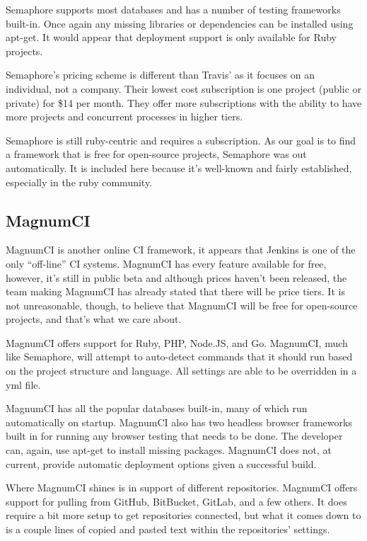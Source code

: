 \documentclass[12pt]{ucthesis}
\begin{document}
Semaphore supports most databases and has a number of testing frameworks built-in. Once again any missing libraries or dependencies can be installed using apt-get. It would appear that deployment support is only available for Ruby projects.

Semaphore's pricing scheme is different than Travis' as it focuses on an individual, not a company. Their lowest cost subscription is one project (public or private) for \$14 per month. They offer more subscriptions with the ability to have more projects and concurrent processes in higher tiers.

Semaphore is still ruby-centric and requires a subscription. As our goal is to find a framework that is free for open-source projects, Semaphore was out automatically. It is included here because it's well-known and fairly established, especially in the ruby community.

\subsection{MagnumCI}
MagnumCI\cite{MagnumCI} is another online CI framework, it appears that Jenkins is one of the only ``off-line'' CI systems. MagnumCI has every feature available for free, however, it's still in public beta and although prices haven't been released, the team making MagnumCI has already stated that there will be price tiers. It is not unreasonable, though, to believe that MagnumCI will be free for open-source projects, and that's what we care about.

MagnumCI offers support for Ruby, PHP, Node.JS, and Go. MagnumCI, much like Semaphore, will attempt to auto-detect commands that it should run based on the project structure and language. All settings are able to be overridden in a yml file.

MagnumCI has all the popular databases built-in, many of which run automatically on startup. MagnumCI also has two headless browser frameworks built in for running any browser testing that needs to be done. The developer can, again, use apt-get to install missing packages. MagnumCI does not, at current, provide automatic deployment options given a successful build.

Where MagnumCI shines is in support of different repositories. MagnumCI offers support for pulling from GitHub, BitBucket, GitLab, and a few others. It does require a bit more setup to get repositories connected, but what it comes down to is a couple lines of copied and pasted text within the repositories' settings.
\end{document}
